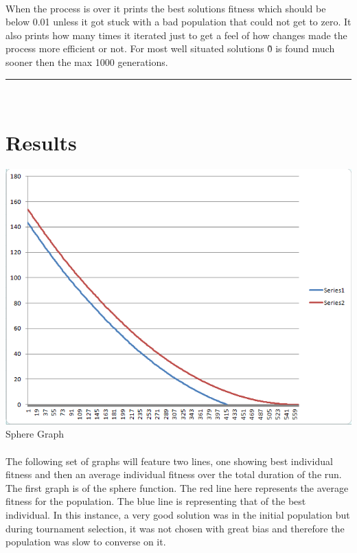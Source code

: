 \documentclass[paper=a4, fontsize=11pt]{scrartcl} %
\numberwithin{equation}{section} %
\numberwithin{figure}{section} %
\numberwithin{table}{section} %
\newcommand{\horrule}[1]{\rule{\linewidth}{#1}} %
\begin{document}
\paragraph{}When the process is over it prints the best solutions fitness which should be below 0.01 unless it got stuck with a bad population that could not get to zero. It also prints how many times it iterated just to get a feel of how changes made the process more efficient or not. For most well situated solutions \~0 is found much sooner then the max 1000 generations.

\horrule{0.5pt} \\[0.4cm] %
\section{Results}


\includegraphics{Sphere}
Sphere Graph

\paragraph{} The following set of graphs will feature two lines, one showing best individual fitness and then an average individual fitness over the total duration of the run. The first graph is of the sphere function. The red line here represents the average fitness for the population. The blue line is representing that of the best individual. In this instance, a very good solution was in the initial population but during tournament selection, it was not chosen with great bias and therefore the population was slow to converse on it.
\end{document}
